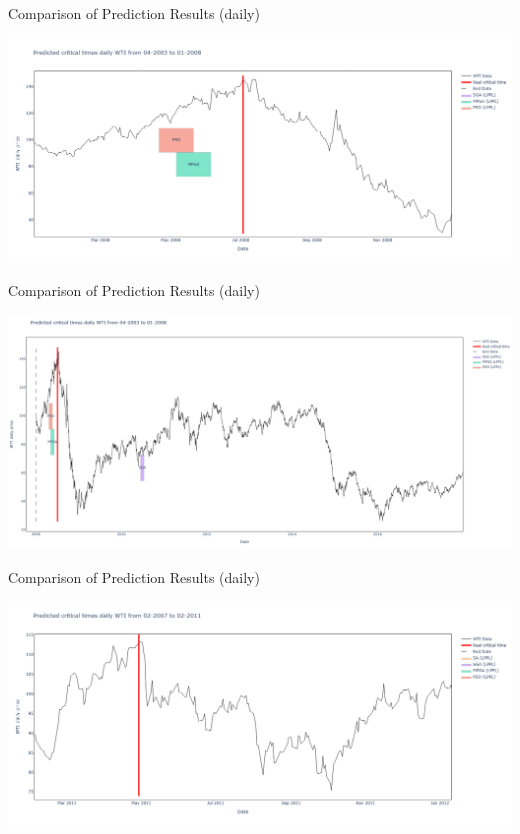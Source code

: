 \documentclass{beamer}
\begin{document}
\begin{frame}{Comparison of Prediction Results (daily)}
    \begin{center}
        \includegraphics[width=\textwidth]{plot_overlead/daily_WTI_1.png}
    \end{center}
\end{frame}

\begin{frame}{Comparison of Prediction Results (daily)}
    \begin{center}
        \includegraphics[width=\textwidth]{plot_overlead/daily_WTI_1_all_price.png}
    \end{center}
\end{frame}

\begin{frame}{Comparison of Prediction Results (daily)}
    \begin{center}
        \includegraphics[width=\textwidth]{plot_overlead/daily_WTI_2.png}
    \end{center}
\end{frame}
\end{document}
